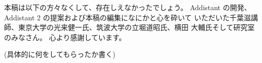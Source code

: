 本稿は以下の方々なくして、存在しえなかったでしょう。
Addistant の開発、Addistant 2 の提案および本稿の編集になにかと心を砕いて
いただいた千葉滋講師、東京大学の光来健一氏、筑波大学の立堀道昭氏、横田
大輔氏そして研究室のみなさん。
心より感謝しています。

(具体的に何をしてもらったか書く)
